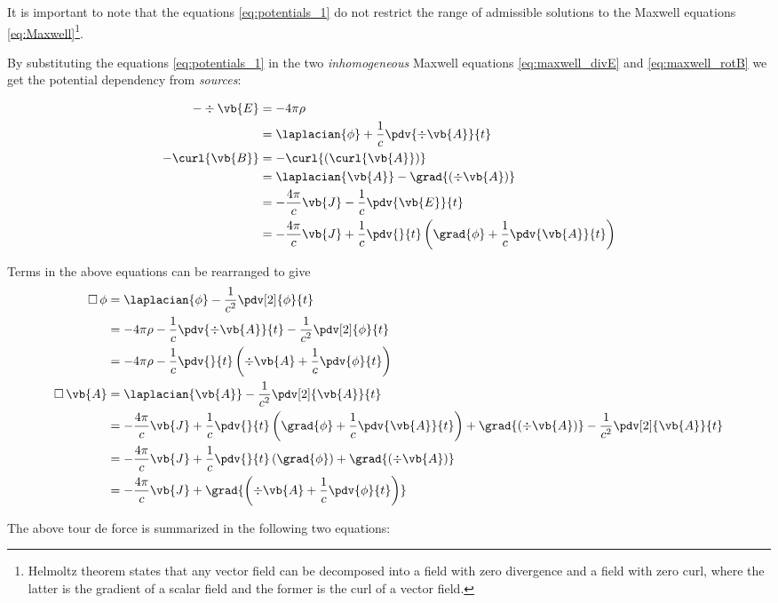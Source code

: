 It is important to note that the equations \ref{eq:potentials_1} do not restrict the range of admissible solutions to the Maxwell equations \ref{eq:Maxwell}\footnote{Helmoltz theorem states that any vector field can be decomposed into a field with zero divergence and a field with zero curl, where the latter is the gradient of a scalar field and the former is the curl of a vector field.}. 

By substituting the equations \ref{eq:potentials_1} in the two \textit{inhomogeneous} Maxwell equations \ref{eq:maxwell_divE} and \ref{eq:maxwell_rotB} we get the potential dependency from \textit{sources}: 

\begin{align*}
- \div{\vb{E}} &= - 4 \pi \rho \\
			&= \laplacian{\phi} + \frac{1}{c} \pdv{\div{\vb{A}}}{t} \\
- \curl{\vb{B}} &= - \curl{(\curl{\vb{A}})} \\
			&= \laplacian{\vb{A}} - \grad{(\div{\vb{A})}} \\
			&= - \frac{4 \pi}{c} \vb{J} - \frac{1}{c} \pdv{\vb{E}}{t} \\
			&= - \frac{4 \pi}{c} \vb{J} + \frac{1}{c} \pdv{}{t} \left( \grad{\phi} + \frac{1}{c} \pdv{\vb{A}}{t}   \right)	
\end{align*}

Terms in the above equations can be rearranged to give 
\begin{align*}
\Box \, \phi &= \laplacian{\phi} - \frac{1}{c^2} \pdv[2]{\phi}{t} \\
			&= - 4 \pi \rho - \frac{1}{c} \pdv{\div{\vb{A}}}{t} - \frac{1}{c^2} \pdv[2]{\phi}{t} \\
			&= - 4 \pi \rho - \frac{1}{c} \pdv{}{t} \left( \div{\vb{A}} + \frac{1}{c} \pdv{\phi}{t}  \right) \\
\Box \, \vb{A} &= \laplacian{\vb{A}} - \frac{1}{c^2} \pdv[2]{\vb{A}}{t} \\
			&= - \frac{4 \pi}{c} \vb{J} + \frac{1}{c} \pdv{}{t} \left( \grad{\phi} + \frac{1}{c} \pdv{\vb{A}}{t}   \right) + \grad{(\div{\vb{A})}} - \frac{1}{c^2} \pdv[2]{\vb{A}}{t} \\
			&= - \frac{4 \pi}{c} \vb{J} + \frac{1}{c} \pdv{}{t} \left( \grad{\phi} \right) + \grad{(\div{\vb{A})}} \\
			&= - \frac{4 \pi}{c} \vb{J} + \grad{\left( \div{\vb{A}} + \frac{1}{c} \pdv{\phi}{t}  \right)}
\end{align*}

The above tour de force is summarized in the following two equations:
 
